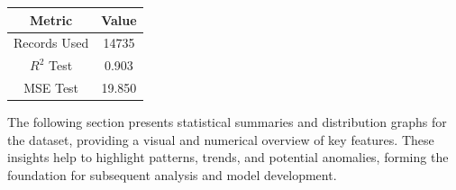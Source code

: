 \hfill
\begin{minipage}[t]{0.48\textwidth}
	\centering
	\renewcommand{\arraystretch}{1} %
	\begin{tabular}{|c|c|}
		\hline
		\textbf{Metric} & \textbf{Value} \\
		\hline
		Records Used    & 14735          \\
		\hline
		$R^{2}$ Test    & 0.903          \\
		\hline
		MSE Test        & 19.850         \\
		\hline
	\end{tabular}
\end{minipage}

The following section presents statistical summaries and distribution graphs for
the dataset, providing a visual and numerical overview of key features. These insights
help to highlight patterns, trends, and potential anomalies, forming the
foundation for subsequent analysis and model development.

